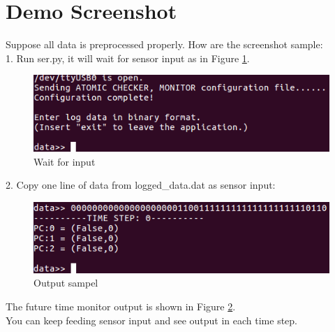 \documentclass{article}
\theoremstyle{definition}
\begin{document}
 \section{Demo Screenshot}
 Suppose all data is preprocessed properly. How are the screenshot sample:\\
 1. Run \textcolor{purple!30}{ser.py}, it will wait for sensor input as in Figure \ref{step1}.
  \begin{figure}[h]
\caption{Wait for input}
\label{step1}
\includegraphics[width=12cm]{./fig/step1.png}
\centering
\end{figure}

2. Copy one line of data from \textcolor{purple!30}{logged\_data.dat} as sensor input:\\
\begin{figure}[h]
\caption{Output sampel}
\label{step2}
\includegraphics[width=12cm]{./fig/step2.png}
\centering
\end{figure}
The future time monitor output is shown in Figure \ref{step2}.\\

You can keep feeding sensor input and see output in each time step. 
\end{document}
